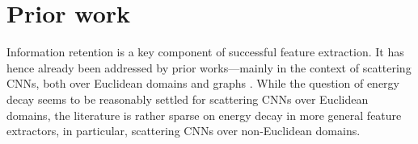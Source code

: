 \section{Prior work}
\label{sec: Prior work}

Information retention is a key %
component of successful feature extraction. It has hence already been addressed by prior works---mainly in the context of scattering CNNs, both over Euclidean domains \cite{mallat2012group,waldspurger2017exponential,wiatowski2017energy,wiatowski2017topology,czaja2019analysis,fuhr2024energy} and graphs \cite{zou2020graph,perlmutter2023understanding}. While the question of energy decay seems to be reasonably settled for scattering CNNs over Euclidean domains, the literature is rather sparse on energy decay in more general feature extractors, in particular, scattering CNNs over non-Euclidean domains. %